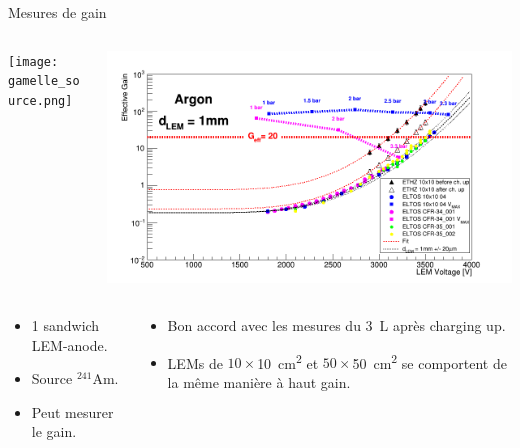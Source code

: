     \begin{frame}{Mesures de gain}
    	\begin{scriptsize}
    		\begin{columns}
    			\begin{column}{0.46\textwidth}
    				\centering \texttt{[image: gamelle\_source.png]}
    			\end{column}\hfill
    			\begin{column}{0.58\textwidth}
    				\centering \includegraphics[width=\textwidth]{./pictures/gain.png}
    			\end{column}
    		\end{columns}\vfill
    		\begin{columns}
    			\begin{column}{0.38\textwidth}
    				\begin{itemize}
    					\item 1 sandwich LEM-anode.
    					\item Source $^{241}$Am.
    					\item Peut mesurer le gain.
    				\end{itemize}
    			\end{column}\hfill
    			\begin{column}{0.58\textwidth}
    				\begin{itemize}
        				\item Bon accord avec les mesures du \SI{3}{\liter} après charging up.
    					\item LEMs de $10\times$\SI{10}{\centi\meter\squared} et $50\times$\SI{50}{\centi\meter\squared} se comportent de la même manière à haut gain.

\end{itemize}
\end{column}
\end{columns}
\end{scriptsize}
\end{frame}
